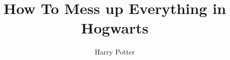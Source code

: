 \documentclass{swfuproposalm}
\title{How To Mess up Everything in Hogwarts}
\author{Harry Potter}
\begin{document}
\makeproposal
\end{document}
